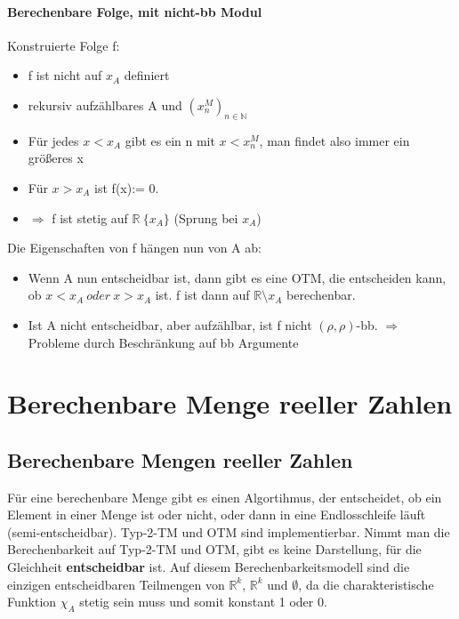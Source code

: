 \documentclass[ngerman]{scrartcl}
\begin{document}
\paragraph{Berechenbare Folge, mit nicht-bb Modul} Konstruierte Folge f:
\begin{itemize}
    \item f ist nicht auf $ x_A $ definiert
    \item rekursiv aufzählbares A und $ (x_n^M)_{n\in \mathbb{N}} $
    \item Für jedes $ x < x_A $ gibt es ein n mit $ x < x_n^M $, man findet also immer ein größeres x
    \item Für $ x > x_A $ ist f(x):= 0.
    \item $ \Rightarrow $ f ist stetig auf $ \mathbb{R}\ \{x_A \} $ (Sprung bei $ x_A $)
\end{itemize}
Die Eigenschaften von f hängen nun von A ab:
\begin{itemize}
    \item Wenn A nun entscheidbar ist, dann gibt es eine OTM, die entscheiden kann, ob $ x < x_A\ oder\ x > x_A $ ist. f ist dann auf $ \mathbb{R} \setminus x_A $ berechenbar.
    \item Ist A nicht entscheidbar, aber aufzählbar, ist f nicht $ (\rho, \rho)$-bb. $ \Rightarrow $ Probleme durch Beschränkung auf bb Argumente
\end{itemize}

%
%
\section{Berechenbare Menge reeller Zahlen}

\subsection{Berechenbare Mengen reeller Zahlen}
Für eine berechenbare Menge gibt es einen Algortihmus, der entscheidet, ob ein Element in einer Menge ist oder nicht, oder dann in eine Endlosschleife läuft (semi-entscheidbar). Typ-2-TM und OTM sind implementierbar. Nimmt man die Berechenbarkeit auf Typ-2-TM und OTM, gibt es keine Darstellung, für die Gleichheit \textbf{entscheidbar} ist. Auf diesem Berechenbarkeitsmodell sind die einzigen entscheidbaren Teilmengen von $ \mathbb{R}^k $, $ \mathbb{R}^k $ und $ \emptyset $, da die charakteristische Funktion $ \chi_A $ stetig sein muss und somit konstant 1 oder 0.
\end{document}
